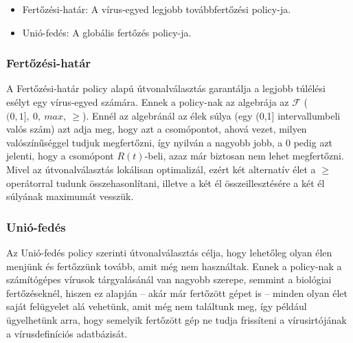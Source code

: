     \begin{itemize}
      \item Fertőzési-határ: A vírus-egyed legjobb továbbfertőzési policy-ja.
      \item Unió-fedés: A globális fertőzés policy-ja.
    \end{itemize}

      \subsubsection{Fertőzési-határ}

      A Fertőzési-határ policy alapú útvonalválasztás garantálja a legjobb túlélési esélyt egy vírus-egyed számára. Ennek a policy-nak az algebrája az $\mathcal{F}$ ($(0,1],~0,~max,~\geq$). Ennél az algebránál az élek súlya (egy (0,1] intervallumbeli valós szám) azt adja meg, hogy azt a csomópontot, ahová vezet, milyen valószínűséggel tudjuk megfertőzni, így nyilván a nagyobb jobb, a 0 pedig azt jelenti, hogy a csomópont $R(t)$-beli, azaz már biztosan nem lehet megfertőzni. Mivel az útvonalválasztás lokálisan optimalizál, ezért két alternatív élet a $\geq$ operátorral tudunk összehasonlítani, illetve a két él összeillesztésére a két él súlyának maximumát vesszük.

      \subsubsection{Unió-fedés}

      Az Unió-fedés policy szerinti útvonalválasztás célja, hogy lehetőleg olyan élen menjünk és fertőzzünk tovább, amit még nem használtak. Ennek a policy-nak a számítógépes vírusok tárgyalásánál van nagyobb szerepe, semmint a biológiai fertőzéseknél, hiszen ez alapján -- akár már fertőzött gépet is -- minden olyan élet saját felügyelet alá vehetünk, amit még nem találtunk meg, így például ügyelhetünk arra, hogy semelyik fertőzött gép ne tudja frissíteni a vírusirtójának a vírusdefiníciós adatbázisát.

